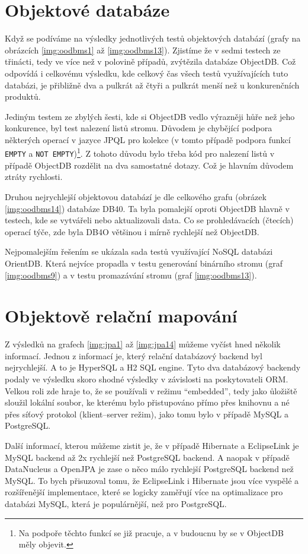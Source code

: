 \section{Objektové databáze}
Když se podíváme na výsledky jednotlivých testů objektových databází (grafy na obrázcích \ref{img:oodbms1} až \ref{img:oodbms13}). Zjistíme že v sedmi testech ze třinácti, tedy ve více než v polovině případů, zvýtězila databáze ObjectDB. Což odpovídá i celkovému výsledku, kde celkový čas všech testů využívajících tuto databázi, je přibližně dva a pulkrát až čtyři a pulkrát menší než u konkurenčních produktů.

Jediným testem ze zbylých šesti, kde si ObjectDB vedlo výrazněji hůře než jeho konkurence, byl test nalezení listů stromu. Důvodem je chybějící podpora některých operací v jazyce JPQL pro kolekce (v tomto případě podpora funkcí \texttt{EMPTY} a \texttt{NOT EMPTY})\footnote{Na podpoře těchto funkcí se již pracuje, a v budoucnu by se v ObjectDB měly objevit.}. Z tohoto důvodu bylo třeba kód pro nalezení listů v případě ObjectDB rozdělit na dva samostatné dotazy. Což je hlavním důvodem ztráty rychlosti.

Druhou nejrychlejší objektovou databází je dle celkového grafu (obrázek \ref{img:oodbms14}) databáze DB40. Ta byla pomalejší oproti ObjectDB hlavně v testech, kde se vytvářeli nebo aktualizovali data. Co se prohledávacích (čtecích) operací týče, zde byla DB4O většinou i mírně rychlejší než ObjectDB.

Nejpomalejším řešením se ukázala sada testů využívající NoSQL databázi OrientDB. Která nejvíce propadla v testu generování binárního stromu (graf \ref{img:oodbms9}) a v testu promazávání stromu (graf \ref{img:oodbms13}).


\section{Objektově relační mapování}
Z výsledků na grafech \ref{img:jpa1} až \ref{img:jpa14} můžeme vyčíst hned několik informací. Jednou z informací je, který relační databázový backend byl nejrychlejší. A to je HyperSQL a H2 SQL engine. Tyto dva databázový backendy podaly ve výsledku skoro shodné výsledky v závislosti na poskytovateli ORM. Velkou roli zde hraje to, že se používali v režimu "`embedded"', tedy jako ůložiště sloužil lokální soubor, ke kterému bylo přistupováno přímo přes knihovnu a né přes síťový protokol (klient--server režim), jako tomu bylo v případě MySQL a PostgreSQL.

Další informací, kterou můžeme zistit je, že v případě Hibernate a EclipseLink je MySQL backend až 2x rychlejší než PostgreSQL backend. A naopak v případě DataNucleus a OpenJPA je zase o něco málo rychlejší PostgreSQL backend než MySQL. To bych přisuzoval tomu, že EclipseLink i Hibernate jsou více vyspělé a rozšířenější implementace, které se logicky zaměřují více na optimalizace pro databázi MySQL, která je populárnější, než pro PostgreSQL.

